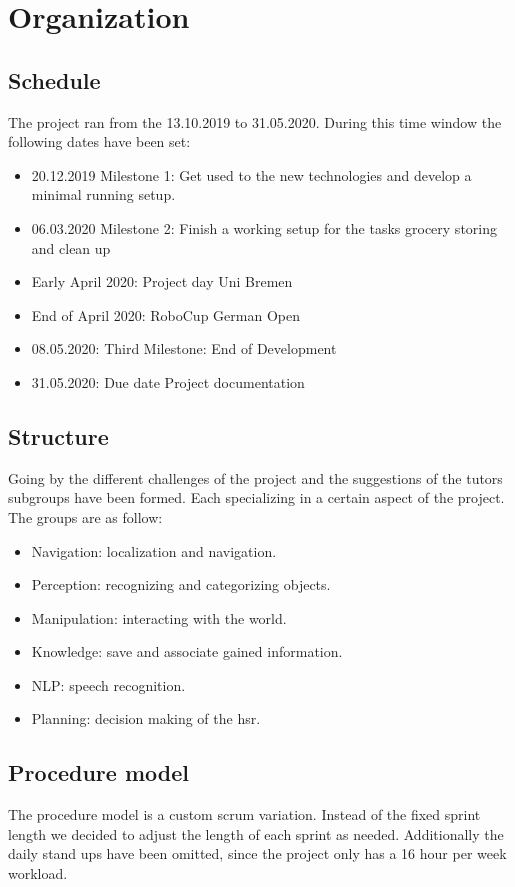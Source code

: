 \documentclass[main.tex]{subfiles}
\begin{document}
	\chapter{Organization}
	
	\section{Schedule}
	The project ran from the 13.10.2019 to 31.05.2020. During this time window the following dates have been set:
	\begin{itemize}
		\item 20.12.2019 Milestone 1: Get used to the new technologies and develop a minimal running setup.
		\item 06.03.2020 Milestone 2: Finish a working setup for the tasks grocery storing and clean up
		\item Early April 2020: Project day Uni Bremen
		\item End of April 2020: RoboCup German Open
		\item 08.05.2020: Third Milestone: End of Development
		\item 31.05.2020: Due date Project documentation
	\end{itemize}

	\section{Structure}
	Going by the different challenges of the project and the suggestions of the tutors subgroups have been formed. Each specializing in a certain aspect of the project. 
	The groups are as follow:
	\begin{itemize}
		\item Navigation: localization and navigation.
		\item Perception: recognizing and categorizing objects.
		\item Manipulation: interacting with the world.
		\item Knowledge: save and associate gained information.
		\item NLP: speech recognition.
		\item Planning: decision making of the hsr.
	\end{itemize}   

	\section{Procedure model}
	The procedure model is a custom scrum variation. Instead of the fixed sprint length we decided to adjust the length of each sprint as needed. Additionally the daily stand ups have been omitted, since the project only has a 16 hour per week workload.
	
\end{document}
